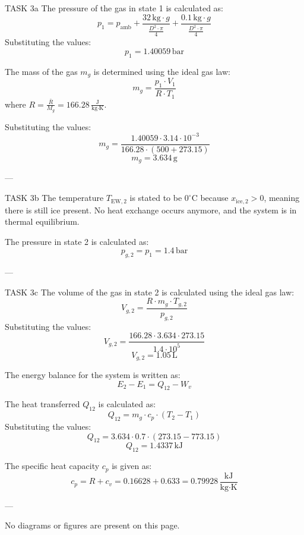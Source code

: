 TASK 3a  
The pressure of the gas in state 1 is calculated as:  
\[
p_1 = p_{\text{amb}} + \frac{32 \, \text{kg} \cdot g}{\frac{D^2 \cdot \pi}{4}} + \frac{0.1 \, \text{kg} \cdot g}{\frac{D^2 \cdot \pi}{4}}
\]  
Substituting the values:  
\[
p_1 = 1.40059 \, \text{bar}
\]  

The mass of the gas \( m_g \) is determined using the ideal gas law:  
\[
m_g = \frac{p_1 \cdot V_1}{R \cdot T_1}
\]  
where \( R = \frac{\bar{R}}{M_g} = 166.28 \, \frac{\text{J}}{\text{kg·K}} \).  

Substituting the values:  
\[
m_g = \frac{1.40059 \cdot 3.14 \cdot 10^{-3}}{166.28 \cdot (500 + 273.15)}
\]  
\[
m_g = 3.634 \, \text{g}
\]  

---

TASK 3b  
The temperature \( T_{\text{EW},2} \) is stated to be \( 0^\circ\text{C} \) because \( x_{\text{ice},2} > 0 \), meaning there is still ice present. No heat exchange occurs anymore, and the system is in thermal equilibrium.  

The pressure in state 2 is calculated as:  
\[
p_{g,2} = p_1 = 1.4 \, \text{bar}
\]  

---

TASK 3c  
The volume of the gas in state 2 is calculated using the ideal gas law:  
\[
V_{g,2} = \frac{R \cdot m_g \cdot T_{g,2}}{p_{g,2}}
\]  
Substituting the values:  
\[
V_{g,2} = \frac{166.28 \cdot 3.634 \cdot 273.15}{1.4 \cdot 10^5}
\]  
\[
V_{g,2} = 1.05 \, \text{L}
\]  

The energy balance for the system is written as:  
\[
E_2 - E_1 = Q_{12} - W_v
\]  

The heat transferred \( Q_{12} \) is calculated as:  
\[
Q_{12} = m_g \cdot c_p \cdot (T_2 - T_1)
\]  
Substituting the values:  
\[
Q_{12} = 3.634 \cdot 0.7 \cdot (273.15 - 773.15)
\]  
\[
Q_{12} = 1.4337 \, \text{kJ}
\]  

The specific heat capacity \( c_p \) is given as:  
\[
c_p = R + c_v = 0.16628 + 0.633 = 0.79928 \, \frac{\text{kJ}}{\text{kg·K}}
\]  

---

No diagrams or figures are present on this page.